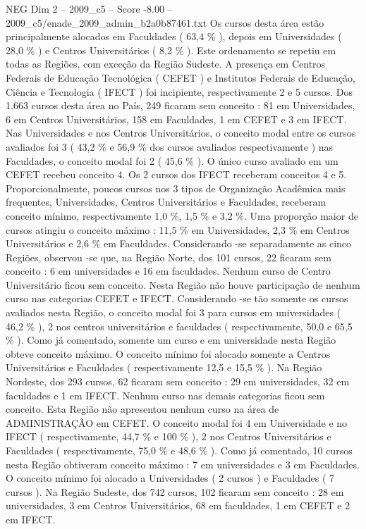 \begin{textsample}{NEG Dim 2 – 2009\_c5 – Score -8.00 – 2009\_c5/enade\_2009\_admin\_b2a0b87461.txt}
Os cursos desta área estão principalmente alocados em Faculdades ( 63,4 \% ), depois em Universidades ( 28,0 \% ) e Centros Universitários ( 8,2 \% ).
Este ordenamento se repetiu em todas as Regiões, com exceção da Região Sudeste.
A presença em Centros Federais de Educação Tecnológica ( CEFET ) e Institutos Federais de Educação, Ciência e Tecnologia ( IFECT ) foi incipiente, respectivamente 2 e 5 cursos.
Dos 1.663 cursos desta área no País, 249 ficaram sem conceito : 81 em Universidades, 6 em Centros Universitários, 158 em Faculdades, 1 em CEFET e 3 em IFECT.
Nas Universidades e nos Centros Universitários, o conceito modal entre os cursos avaliados foi 3 ( 43,2 \% e 56,9 \% dos cursos avaliados respectivamente ) nas Faculdades, o conceito modal foi 2 ( 45,6 \% ).
O único curso avaliado em um CEFET recebeu conceito 4.
Os 2 cursos dos IFECT receberam conceitos 4 e 5.
Proporcionalmente, poucos cursos nos 3 tipos de Organização Acadêmica mais frequentes, Universidades, Centros Universitários e Faculdades, receberam conceito mínimo, respectivamente 1,0 \%, 1,5 \% e 3,2 \%.
Uma proporção maior de cursos atingiu o conceito máximo : 11,5 \% em Universidades, 2,3 \% em Centros Universitários e 2,6 \% em Faculdades.
Considerando -se separadamente as cinco Regiões, observou -se que, na Região Norte, dos 101 cursos, 22 ficaram sem conceito : 6 em universidades e 16 em faculdades.
Nenhum curso de Centro Universitário ficou sem conceito.
Nesta Região não houve participação de nenhum curso nas categorias CEFET e IFECT.
Considerando -se tão somente os cursos avaliados nesta Região, o conceito modal foi 3 para cursos em universidades ( 46,2 \% ), 2 nos centros universitários e faculdades ( respectivamente, 50,0 e 65,5 \% ).
Como já comentado, somente um curso e em universidade nesta Região obteve conceito máximo.
O conceito mínimo foi alocado somente a Centros Universitários e Faculdades ( respectivamente 12,5 e 15,5 \% ).
Na Região Nordeste, dos 293 cursos, 62 ficaram sem conceito : 29 em universidades, 32 em faculdades e 1 em IFECT.
Nenhum curso nas demais categorias ficou sem conceito.
Esta Região não apresentou nenhum curso na área de ADMINISTRAÇÃO em CEFET.
O conceito modal foi 4 em Universidade e no IFECT ( respectivamente, 44,7 \% e 100 \% ), 2 nos Centros Universitários e Faculdades ( respectivamente, 75,0 \% e 48,6 \% ).
Como já comentado, 10 cursos nesta Região obtiveram conceito máximo : 7 em universidades e 3 em Faculdades.
O conceito mínimo foi alocado a Universidades ( 2 cursos ) e Faculdades ( 7 cursos ).
Na Região Sudeste, dos 742 cursos, 102 ficaram sem conceito : 28 em universidades, 3 em Centros Universitários, 68 em faculdades, 1 em CEFET e 2 em IFECT.

\end{textsample}
